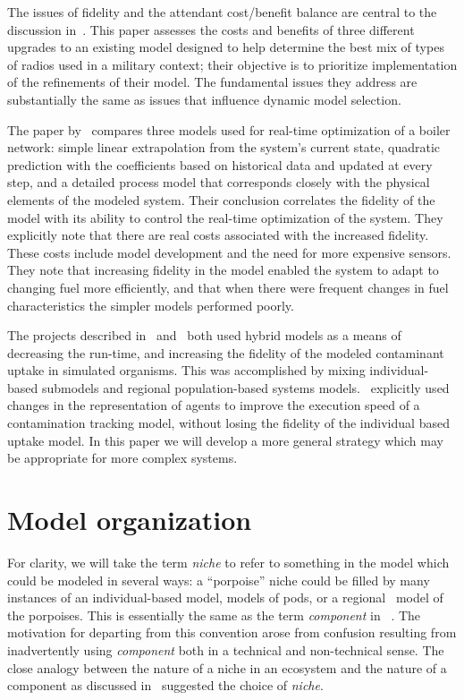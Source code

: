 The issues of fidelity and the attendant cost/benefit balance are
central to the dis\-cus\-sion in~\cite{bailey1992scientific}.  This paper
assesses the costs and benefits of three dif\-fer\-ent upgrades to an
existing model designed to help de\-ter\-mine the best mix of types of
radios used in a mil\-i\-tary con\-text; their ob\-jec\-tive is to prioritize
im\-ple\-men\-ta\-tion of the refinements of their model. The fun\-da\-men\-tal
issues they address are substantially the same as issues that
in\-flu\-ence dynamic model selection.

The paper by~\cite{yip2004effect} compares three models used for
real-time optimization of a boiler network: simple linear
extrapolation from the system's current state, quadratic prediction
with the coefficients based on historical data and updated at every
step, and a detailed process model that corresponds closely with the
physical elements of the modeled system. Their conclusion correlates
the fidelity of the model with its ability to control the real-time
optimization of the system. They explicitly note that there are real
costs associated with the increased fidelity. These costs include
model development and the need for more expensive sensors. They note
that increasing fidelity in the model enabled the system to adapt to
changing fuel more efficiently, and that when there were frequent
changes in fuel characteristics the simpler models performed poorly.

The projects described in~\cite{little2006nws} and~\cite{fulton2011ningaloo}
both used hybrid models as a means of decreasing the run-time, and
increasing the fidelity of the modeled contaminant uptake in 
simulated organisms. This was accomplished by mixing in\-di\-vidu\-al-based
sub\-models and regional population-based systems
models.~\cite{gray2012adaptive} explicitly used changes in the rep\-re\-sentation
of agents to improve the execution speed of a contamination tracking
model, without losing the fidelity of the in\-di\-vidu\-al based uptake
model. In this paper we will develop a more general strategy which may
be appropriate for more complex systems.


\section{Model organization}

For clarity, we will take the term \emph{niche} to refer to something
in the model which could be modeled in several ways: a ``porpoise''
niche could be filled by many instances of an in\-di\-vidu\-al-based
model, models of pods, or a regional \SD\ model of the porpoises.
This is essentially the same as the term \emph{component} in~
\cite{vincenot2011theoretical}. The motivation for departing from this
convention arose from confusion resulting from inadvertently using
\emph{component} both in a technical and non-technical sense.  The
close analogy between the nature of a niche in an ecosystem and the
nature of a component as discussed in~\cite{vincenot2011theoretical}
suggested the choice of \emph{niche}. 

